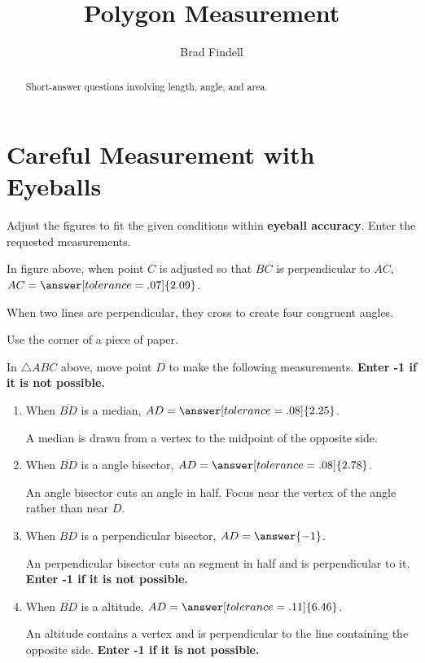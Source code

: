 \documentclass[nooutcomes]{ximera}
\title{Polygon Measurement}
\author{Brad Findell}
\begin{document}
\begin{abstract}
Short-answer questions involving length, angle, and area. 
\end{abstract}
\maketitle

\section{Careful Measurement with Eyeballs}
Adjust the figures to fit the given conditions within \textbf{eyeball accuracy}.  Enter the requested measurements.  

\begin{center}  
\end{center}
\begin{problem}
In figure above, when point $C$ is adjusted so that $BC$ is perpendicular to $AC$, $AC=\answer[tolerance=.07]{2.09}$.
\begin{hint}
When two lines are perpendicular, they cross to create four congruent angles. 
\end{hint}
\begin{hint}
Use the corner of a piece of paper.
\end{hint}
\end{problem}


\begin{center}  
\end{center}
\begin{problem}
In $\triangle ABC$ above, move point $D$ to make the following measurements.  \textbf{Enter -1 if it is not possible.}   
\begin{enumerate}
\item When $\overline{BD}$ is a median, $AD=\answer[tolerance=.08]{2.25}$.
\begin{hint}
A median is drawn from a vertex to the midpoint of the opposite side.
\end{hint}
\item When $\overline{BD}$ is a angle bisector, $AD=\answer[tolerance=.08]{2.78}$.
\begin{hint}
An angle bisector cuts an angle in half.  Focus near the vertex of the angle rather than near $D$.
\end{hint}
\item When $\overline{BD}$ is a perpendicular bisector, $AD=\answer{-1}$.
\begin{hint}
An perpendicular bisector cuts an segment in half and is perpendicular to it. \textbf{Enter -1 if it is not possible.} 
\end{hint}
\item When $\overline{BD}$ is a altitude, $AD=\answer[tolerance=.11]{6.46}$.
\begin{hint}
An altitude contains a vertex and is perpendicular to the line containing the opposite side. \textbf{Enter -1 if it is not possible.} 
\end{hint}
\end{enumerate}
\end{problem}
\end{document}
